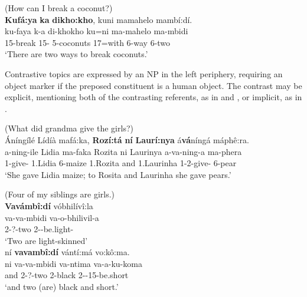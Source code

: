 \documentclass[output=paper]{langscibook}
\begin{document}
\ea
\label{bkm:Ref121987443}
(How can I break a coconut?)\\
\textbf{Kufá:ya} \textbf{ka} \textbf{dikho:kho}, kuni mamahelo mambí:dí.\\
\gll
ku-faya  k-a  di-khokho  ku=ni  ma-mahelo  ma-mbidi\\
15-break  15-\CONN{}  5-coconuts  17\SM{}=with  6-way  6-two\\
\glt
‘There are two ways to break coconuts.’\\

\z

Contrastive topics are expressed by an NP in the left periphery, requiring an object marker if the preposed constituent is a human object. The contrast may be explicit, mentioning both of the contrasting referents, as in  and , or implicit, as in .

\ea
\label{bkm:Ref141347619}
(What did grandma give the girls?)\\
Áníngílé Lídíà mafá:ka, \textbf{Rozí:tá} \textbf{ní} \textbf{Laurí:nya} á\textbf{vá}níngá máphê:ra.\\
\gll
a-ning-ile  Lidia  ma-faka  Rozita  ni Laurinya  a-va{}-ning-a  ma-phera\\
1\SM{}-give-\PFV{}  1.Lidia  6-maize  1.Rozita  and  1.Laurinha  1\SM{}-2\OM{}-give-\FV{}  6-pear\\
\glt
‘She gave Lidia maize; to Rosita and Laurinha she gave pears.’\\

\z

\ea
\label{bkm:Ref141347629}
(Four of my siblings are girls.)\\
\textbf{Vavámbî:dí} vóbhilívî:la\\
\gll
va-va-mbidi  va-o-bhilivil-a\\
2-?\CONN{}-two  2\SM{}-\PROG{}-be.light-\FV{}\\
\glt
‘Two are light-skinned’\\

\sn
ní \textbf{vavambî:dí} vántí:má vo:kô:ma.\\
\gll
ni  va-va-mbidi  va-ntima  va-a-ku-koma\\
and  2-?\CONN{}-two  2-black  2-\CONN{}-15-be.short\\
\glt
‘and two (are) black and short.’
\end{document}
